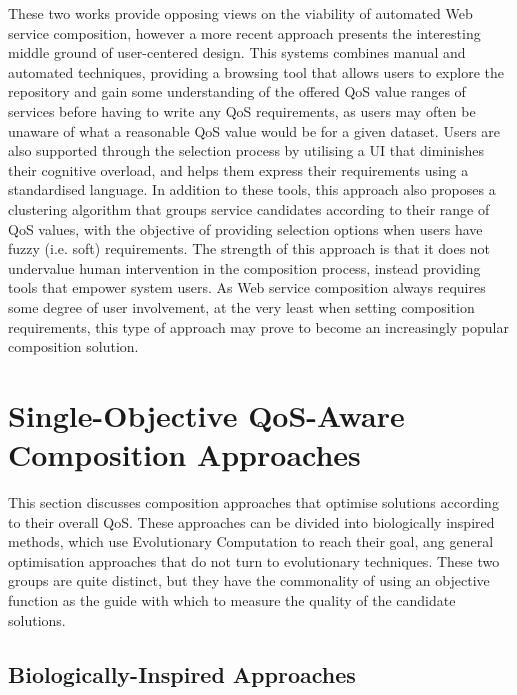 These two works provide opposing views on the viability of automated Web service composition, however a more recent approach \cite{mobedpour2013user} presents the interesting middle ground of user-centered design. This systems combines manual and automated techniques, providing a browsing tool that allows users to explore the repository and gain some understanding of the offered QoS value ranges of services before having to write any QoS requirements, as users may often be unaware of what a reasonable QoS value would be for a given dataset. Users are also supported through the selection process by utilising a UI that diminishes their cognitive overload, and helps them express their requirements using a standardised language. In addition to these tools, this approach also proposes a clustering algorithm that groups service candidates according to their range of QoS values, with the objective of providing selection options when users have fuzzy (i.e. soft) requirements. The strength of this approach is that it does not undervalue human intervention in the composition process, instead providing tools that empower system users. As Web service composition always requires some degree of user involvement, at the very least when setting composition requirements, this type of approach may prove to become an increasingly popular composition solution.

\section{Single-Objective QoS-Aware Composition Approaches}\label{SingleObjective}

This section discusses composition approaches that optimise solutions according to their overall QoS. These approaches can be divided into biologically inspired methods, which use Evolutionary Computation to reach their goal, ang general optimisation approaches that do not turn to evolutionary techniques. These two groups are quite distinct, but they have the commonality of using an objective function as the guide with which to measure the quality of the candidate solutions.

\subsection{Biologically-Inspired Approaches}


